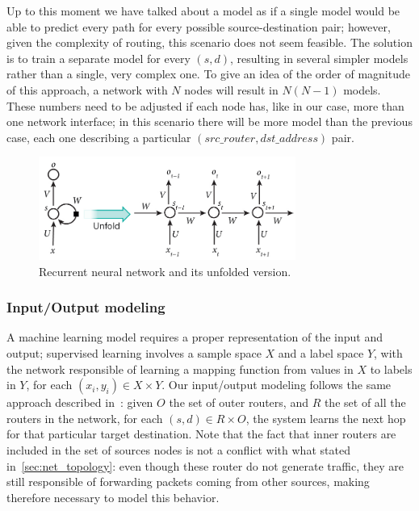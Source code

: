 Up to this moment we have talked about a model as if a single model would be able to  predict every path for every possible source-destination pair; however, given the complexity of routing, this scenario does not seem feasible. The solution is to train a separate model for every $(s,d)$, resulting in several simpler models rather than a single, very complex one. To give an idea of the order of magnitude of this approach, a network with $N$ nodes will result in $N(N-1)$ models. These numbers need to be adjusted if each node has, like in our case, more than one network interface; in this scenario there will be more model than the previous case, each one describing a particular $(src\_router, dst\_address)$ pair.
\begin{figure}[h]
\centering
\includegraphics[width=0.75\textwidth]{img/rnn}
\caption{Recurrent neural network and its unfolded version.\protect\footnotemark }
\label{fig:rnn}
\end{figure}

\subsubsection{Input/Output modeling}
A machine learning model requires a proper representation of the input and output; supervised learning involves a sample space $X$ and a label space $Y$, with the network responsible of learning a mapping function from values in $X$ to labels in $Y$, for each $(x_i, y_i) \in X\times Y$. Our input/output modeling follows the same approach described in~\cite{Kato}: given $O$ the set of outer routers, and $R$ the set of all the routers in the network, for each $(s, d) \in R \times O$, the system learns the next hop for that particular target destination. Note that the fact that inner routers are included in the set of sources nodes is not a conflict with what stated in~\ref{sec:net_topology}: even though these router do not generate traffic, they are still responsible of forwarding packets coming from other sources, making therefore necessary to model this behavior. 

